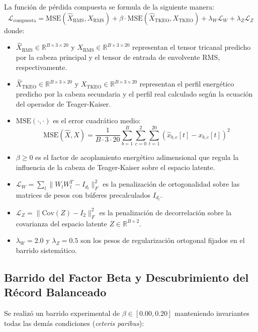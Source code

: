 \documentclass[11pt,a4paper]{article}
\begin{document}
La función de pérdida compuesta se formula de la siguiente manera:
\begin{equation}
    \mathcal{L}_{\text{compuesta}} = \text{MSE}(\hat{X}_{\text{RMS}}, X_{\text{RMS}}) + \beta \cdot \text{MSE}(\hat{X}_{\text{TKEO}}, X_{\text{TKEO}}) + \lambda_W \mathcal{L}_W + \lambda_Z \mathcal{L}_Z
\end{equation}
donde:
\begin{itemize}
    \item $\hat{X}_{\text{RMS}} \in \mathbb{R}^{B \times 3 \times 20}$ y $X_{\text{RMS}} \in \mathbb{R}^{B \times 3 \times 20}$ representan el tensor tricanal predicho por la cabeza principal y el tensor de entrada de envolvente RMS, respectivamente.
    \item $\hat{X}_{\text{TKEO}} \in \mathbb{R}^{B \times 3 \times 20}$ y $X_{\text{TKEO}} \in \mathbb{R}^{B \times 3 \times 20}$ representan el perfil energético predicho por la cabeza secundaria y el perfil real calculado según la ecuación del operador de Teager-Kaiser.
    \item $\text{MSE}(\cdot, \cdot)$ es el error cuadrático medio:
    \begin{equation}
        \text{MSE}(\hat{X}, X) = \frac{1}{B \cdot 3 \cdot 20} \sum_{b=1}^B \sum_{c=0}^2 \sum_{t=1}^{20} (\hat{x}_{b, c}[t] - x_{b, c}[t])^2
    \end{equation}
    \item $\beta \ge 0$ es el factor de acoplamiento energético adimensional que regula la influencia de la cabeza de Teager-Kaiser sobre el espacio latente.
    \item $\mathcal{L}_W = \sum_{l} \|W_l W_l^T - I_{d_l}\|_F^2$ es la penalización de ortogonalidad sobre las matrices de pesos con búferes precalculados $I_{d_l}$.
    \item $\mathcal{L}_Z = \|\text{Cov}(Z) - I_2\|_F^2$ es la penalización de decorrelación sobre la covarianza del espacio latente $Z \in \mathbb{R}^{B \times 2}$.
    \item $\lambda_W = 2.0$ y $\lambda_Z = 0.5$ son los pesos de regularización ortogonal fijados en el barrido sistemático.
\end{itemize}

\subsection{Barrido del Factor Beta y Descubrimiento del Récord Balanceado}
\label{subsec:barrido_beta}

Se realizó un barrido experimental de $\beta \in [0.00, 0.20]$ manteniendo invariantes todas las demás condiciones (\textit{ceteris paribus}):
\end{document}
